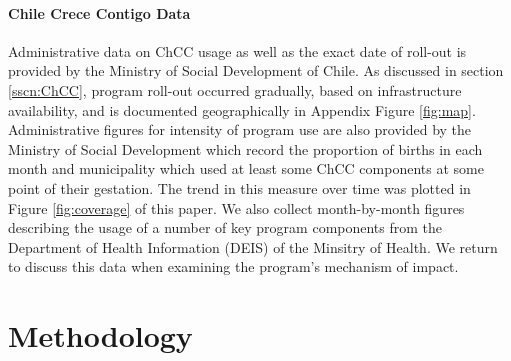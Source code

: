 \documentclass[12pt]{article}
\begin{document}
\begin{spacing}{1.4}
\paragraph{Chile Crece Contigo Data} Administrative data on ChCC
usage as well as the exact date of roll-out is provided by the
Ministry of Social Development of Chile.  As discussed in section
\ref{sscn:ChCC}, program roll-out occurred gradually, based on
infrastructure availability, and is documented geographically
in Appendix Figure \ref{fig:map}.  Administrative figures for
intensity of program use are also provided by the Ministry of
Social Development which record the proportion of births in each
month and municipality which used at least some ChCC components at
some point of their gestation.  The trend in this measure over
time was plotted in Figure \ref{fig:coverage} of this paper.
We also collect month-by-month figures describing the usage of a
number of key program components from the Department of Health
Information (DEIS) of the Minsitry of Health.  We return to discuss
this data when examining the program's mechanism of impact.

\section{Methodology}
\label{scn:methods}

\end{spacing}
\end{document}
